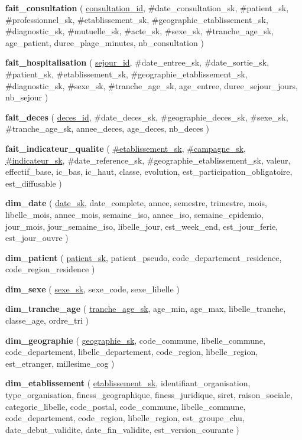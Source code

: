 \begin{mldlist}
\item \textbf{fait\_consultation} ( \underline{consultation\_id}, \#date\_consultation\_sk, \#patient\_sk, \#professionnel\_sk, \#etablissement\_sk, \#geographie\_etablissement\_sk, \#diagnostic\_sk, \#mutuelle\_sk, \#acte\_sk, \#sexe\_sk, \#tranche\_age\_sk, age\_patient, duree\_plage\_minutes, nb\_consultation )
\item \textbf{fait\_hospitalisation} ( \underline{sejour\_id}, \#date\_entree\_sk, \#date\_sortie\_sk, \#patient\_sk, \#etablissement\_sk, \#geographie\_etablissement\_sk, \#diagnostic\_sk, \#sexe\_sk, \#tranche\_age\_sk, age\_entree, duree\_sejour\_jours, nb\_sejour )
\item \textbf{fait\_deces} ( \underline{deces\_id}, \#date\_deces\_sk, \#geographie\_deces\_sk, \#sexe\_sk, \#tranche\_age\_sk, annee\_deces, age\_deces, nb\_deces )
\item \textbf{fait\_indicateur\_qualite} ( \underline{\#etablissement\_sk}, \underline{\#campagne\_sk}, \underline{\#indicateur\_sk}, \#date\_reference\_sk, \#geographie\_etablissement\_sk, valeur, effectif\_base, ic\_bas, ic\_haut, classe, evolution, est\_participation\_obligatoire, est\_diffusable )
\item \textbf{dim\_date} ( \underline{date\_sk}, date\_complete, annee, semestre, trimestre, mois, libelle\_mois, annee\_mois, semaine\_iso, annee\_iso, semaine\_epidemio, jour\_mois, jour\_semaine\_iso, libelle\_jour, est\_week\_end, est\_jour\_ferie, est\_jour\_ouvre )
\item \textbf{dim\_patient} ( \underline{patient\_sk}, patient\_pseudo, code\_departement\_residence, code\_region\_residence )
\item \textbf{dim\_sexe} ( \underline{sexe\_sk}, sexe\_code, sexe\_libelle )
\item \textbf{dim\_tranche\_age} ( \underline{tranche\_age\_sk}, age\_min, age\_max, libelle\_tranche, classe\_age, ordre\_tri )
\item \textbf{dim\_geographie} ( \underline{geographie\_sk}, code\_commune, libelle\_commune, code\_departement, libelle\_departement, code\_region, libelle\_region, est\_etranger, millesime\_cog )
\item \textbf{dim\_etablissement} ( \underline{etablissement\_sk}, identifiant\_organisation, type\_organisation, finess\_geographique, finess\_juridique, siret, raison\_sociale, categorie\_libelle, code\_postal, code\_commune, libelle\_commune, code\_departement, code\_region, libelle\_region, est\_groupe\_chu, date\_debut\_validite, date\_fin\_validite, est\_version\_courante )

\end{mldlist}
